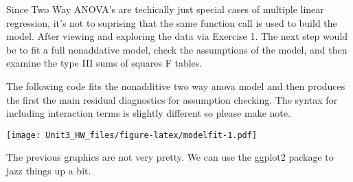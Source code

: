 \documentclass[]{article}
\newenvironment{Shaded}{\begin{snugshade}}{\end{snugshade}}
\newcommand{\DataTypeTok}[1]{\textcolor[rgb]{0.13,0.29,0.53}{#1}}
\newcommand{\DecValTok}[1]{\textcolor[rgb]{0.00,0.00,0.81}{#1}}
\newcommand{\KeywordTok}[1]{\textcolor[rgb]{0.13,0.29,0.53}{\textbf{#1}}}
\newcommand{\NormalTok}[1]{#1}
\newcommand{\OperatorTok}[1]{\textcolor[rgb]{0.81,0.36,0.00}{\textbf{#1}}}
\newcommand{\StringTok}[1]{\textcolor[rgb]{0.31,0.60,0.02}{#1}}
\begin{document}
Since Two Way ANOVA's are techically just special cases of multiple
linear regression, it's not to suprising that the same function call is
used to build the model. After viewing and exploring the data via
Exercise 1. The next step would be to fit a full nonaddative model,
check the assumptions of the model, and then examine the type III sums
of squares F tables.

The following code fits the nonadditive two way anova model and then
produces the first the main residual diagnostics for assumption
checking. The syntax for including interaction terms is slightly
different so please make note.

\begin{Shaded}
\end{Shaded}

\texttt{[image: Unit3\_HW\_files/figure-latex/modelfit-1.pdf]}

The previous graphics are not very pretty. We can use the ggplot2
package to jazz things up a bit.
\end{document}
